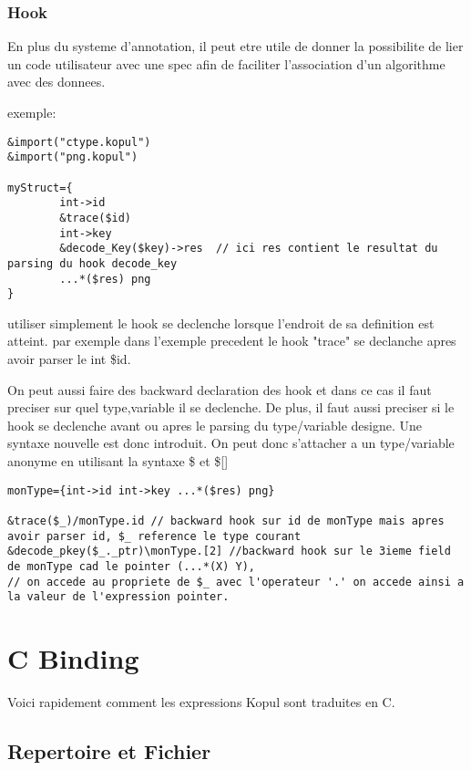 \documentclass[11pt]{report}
\begin{document}
\subsubsection{Hook}

En plus du systeme d'annotation, il peut etre utile de donner la possibilite de lier un code utilisateur avec une spec
afin de faciliter l'association d'un algorithme avec des donnees.

exemple:
\begin{lstlisting}
&import("ctype.kopul")
&import("png.kopul")

myStruct={
        int->id
        &trace($id) 
        int->key
        &decode_Key($key)->res  // ici res contient le resultat du parsing du hook decode_key
        ...*($res) png 
}

\end{lstlisting} %

utiliser simplement le hook se declenche lorsque l'endroit de sa definition est atteint.
par exemple dans l'exemple precedent le hook "trace" se declanche apres avoir parser le int \$id.

On peut aussi faire des backward declaration des hook et dans ce cas il faut preciser sur quel type,variable 
il se declenche. De plus, il faut aussi preciser si le hook se declenche avant ou apres le parsing du type/variable 
designe. Une syntaxe nouvelle est donc introduit. On peut donc s'attacher a un type/variable anonyme en utilisant la 
syntaxe \$ et \$[]

\begin{lstlisting}
monType={int->id int->key ...*($res) png}

&trace($_)/monType.id // backward hook sur id de monType mais apres avoir parser id, $_ reference le type courant
&decode_pkey($_._ptr)\monType.[2] //backward hook sur le 3ieme field de monType cad le pointer (...*(X) Y), 
// on accede au propriete de $_ avec l'operateur '.' on accede ainsi a la valeur de l'expression pointer.

\end{lstlisting} %

\section{C Binding}

Voici rapidement comment les expressions Kopul sont traduites en C.

\subsection{Repertoire et Fichier}
\end{document}

